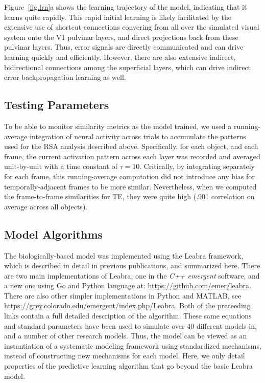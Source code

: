 \documentclass[12pt,twoside]{naturefigs}
\newif\myifpdf
\begin{document}
Figure~\ref{fig.lrn}a shows the learning trajectory of the model, indicating that it learns quite rapidly.  This rapid initial learning is likely facilitated by the extensive use of shortcut connections convering from all over the simulated visual system onto the V1 pulvinar layers, and direct projections back from these pulvinar layers.  Thus, error signals are directly communicated and can drive learning quickly and efficiently.  However, there are also extensive indirect, bidirectional connections among the superficial layers, which can drive indirect error backpropagation learning as well.

\subsection{Testing Parameters}

To be able to monitor similarity metrics as the model trained, we used a running-average integration of neural activity across trials to accumulate the patterns used for the RSA analysis described above.  Specifically, for each object, and each frame, the current activation pattern across each layer was recorded and averaged unit-by-unit with a time constant of $\tau = 10$. Critically, by integrating separately for each frame, this running-average computation did not introduce any bias for temporally-adjacent frames to be more similar.  Nevertheless, when we computed the frame-to-frame similarities for TE, they were quite high (.901 correlation on average across all objects).

\subsection{Model Algorithms}

The biologically-based model was implemented using the Leabra framework, which is described in detail in previous publications\cite{OReillyMunakataFrankEtAl12,OReillyMunakata00,OReilly98,OReilly96}, and summarized here.  There are two main implementations of Leabra, one in the {\em C++ emergent} software, and a new one using  Go and Python language at: \url{https://github.com/emer/leabra}.  There are also other simpler implementations in Python and MATLAB, see \url{https://grey.colorado.edu/emergent/index.php/Leabra}.   Both of the preceeding links contain a full detailed description of the algorithm.  These same equations and standard parameters have been used to simulate over 40 different models in\cite{OReillyMunakataFrankEtAl12,OReillyMunakata00}, and a number of other research models.  Thus, the model can be viewed as an instantiation of a systematic modeling framework using standardized mechanisms, instead of constructing new mechanisms for each model.  Here, we only detail properties of the predictive learning algorithm that go beyond the basic Leabra model.
\end{document}
